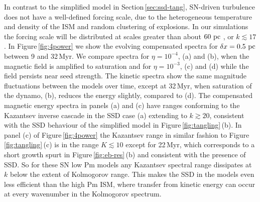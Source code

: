 \documentclass[preprint2]{aastex63}
\newcommand\pc{~ {\rm pc}}
\newcommand\dx{ {\delta x}}
\begin{document}
In contrast to the simplified model in Section\,\ref{sec:ssd-tang}, SN-driven
turbulence does not have a well-defined forcing scale, due to the heterogeneous
temperature and density of the ISM and random clustering of explosions.
In our simulations the forcing scale will be distributed at scales 
greater than about $60\pc$ \citep[][Table\,3]{HSSFG17}, or $k\lesssim17$.
In Figure\,\ref{fig:4power} we show the evolving compensated spectra for
$\dx=0.5\pc$ between 9 and 32\,Myr.
We compare spectra for $\eta=10^{-4}$, (a) and (b), when the magnetic field is 
amplified to saturation and for $\eta=10^{-3}$, (c) and (d) while the field
persists near seed strength.
The kinetic spectra show the same magnitude fluctuations between the models
over time,
except at 32\,Myr, when saturation of the dynamo, (b), reduces
the energy slightly, compared to (d). 
The compensated magnetic energy spectra in panels (a) and (c) have ranges 
conforming to the Kazantsev inverse cascade in the SSD case (a) extending to
$k\gtrsim 20$, consistent with the SSD behaviour of the simplified model in
Figure\,\ref{fig:tangling}\,(b).
In panel (c) of Figure\,\ref{fig:4power} the Kazantsev range in similar fashion
to Figure\,\ref{fig:tangling}\,(c) is in the range 
$K\lesssim10$ except
for 22\,Myr, which corresponds to a short growth spurt in
Figure\,\ref{fig:eb-res}\,(b) and consistent with the presence of SSD.
So for these SN low Pm models any Kazantsev spectral range dissipates 
at $k$ below the extent of Kolmogorov range.
This makes the SSD in the models even less efficient 
than the high Pm ISM,
where transfer from kinetic energy can occur at every wavenumber in the
Kolmogorov spectrum.
\end{document}
